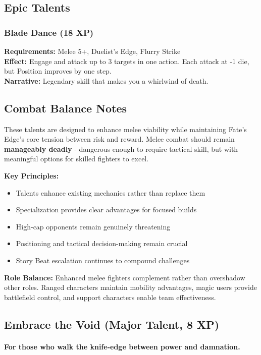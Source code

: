 \subsection{Epic Talents}

\subsubsection{Blade Dance (18 XP)}
\textbf{Requirements:} Melee 5+, Duelist's Edge, Flurry Strike \\
\textbf{Effect:} Engage and attack up to 3 targets in one action. Each attack at -1 die, but Position improves by one step. \\
\textbf{Narrative:} Legendary skill that makes you a whirlwind of death.

\subsection{Combat Balance Notes}

These talents are designed to enhance melee viability while maintaining Fate's Edge's core tension between risk and reward. Melee combat should remain \textbf{manageably deadly} - dangerous enough to require tactical skill, but with meaningful options for skilled fighters to excel.

\textbf{Key Principles:}
\begin{itemize}
    \item Talents enhance existing mechanics rather than replace them
    \item Specialization provides clear advantages for focused builds
    \item High-cap opponents remain genuinely threatening
    \item Positioning and tactical decision-making remain crucial
    \item Story Beat escalation continues to compound challenges
\end{itemize}

\textbf{Role Balance:} Enhanced melee fighters complement rather than overshadow other roles. Ranged characters maintain mobility advantages, magic users provide battlefield control, and support characters enable team effectiveness.

\subsection{Embrace the Void (Major Talent, 8 XP)}
\paragraph{For those who walk the knife-edge between power and damnation.}

